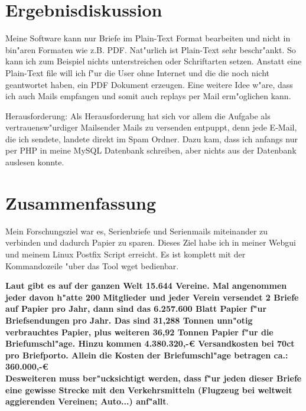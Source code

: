 \documentclass[12pt,twoside]{article}  %
\begin{document}
    \section{Ergebnisdiskussion} %
    Meine Software kann nur Briefe im Plain-Text Format bearbeiten und nicht in 
    bin"aren Formaten wie z.B. PDF. Nat"urlich ist Plain-Text sehr beschr"ankt. So kann ich zum Beispiel 
    nichts unterstreichen oder Schriftarten setzen. Anstatt eine Plain-Text file will ich 
    f"ur die User ohne Internet und die die noch nicht geantwortet haben, ein PDF Dokument erzeugen.
    Eine weitere Idee w"are, dass ich auch Mails empfangen und somit 
    auch \glqq replays\grqq{} per Mail erm"oglichen kann.
    
    Herausforderung:
    Als Herausforderung hat sich vor allem die Aufgabe als vertrauensw"urdiger 
    Mailsender Mails zu versenden entpuppt, denn jede E-Mail, die ich sendete, landete 
    direkt im Spam Ordner. Dazu kam, dass ich anfangs nur per PHP in meine MySQL 
    Datenbank schreiben, aber nichts aus der Datenbank auslesen konnte.

  \section{Zusammenfassung} %
  Mein Forschungsziel war es, Serienbriefe und Serienmails miteinander zu verbinden 
  und dadurch Papier zu sparen. Dieses Ziel habe ich in meiner Webgui und meinem Linux Postfix \cite{postfix} Script erreicht. 
  Es ist komplett mit der Kommandozeile "uber das Tool \glqq wget\grqq{} bedienbar.
  
  \textbf{Laut \cite{VereinsZahl} gibt es auf der ganzen Welt 15.644 Vereine. Mal angenommen 
  jeder davon h"atte 200 Mitglieder und jeder Verein versendet 2 Briefe auf Papier pro Jahr, dann 
  sind das 6.257.600 Blatt Papier f"ur Briefsendungen pro Jahr. Das sind 31,288 Tonnen
  unn"otig verbrauchtes Papier, plus weiteren 36,92 Tonnen Papier f"ur die Briefumschl"age. Hinzu 
  kommen 4.380.320,-\euro{} Versandkosten bei 70ct pro Briefporto. Allein die Kosten der Briefumschl"age betragen ca.: 360.000,-\euro{} \\ 
  Desweiteren muss ber"ucksichtigt werden, dass f"ur jeden dieser 
  Briefe eine gewisse Strecke mit den Verkehrsmitteln (Flugzeug bei weltweit aggierenden Vereinen; Auto...) anf"allt}.
  
\end{document}
